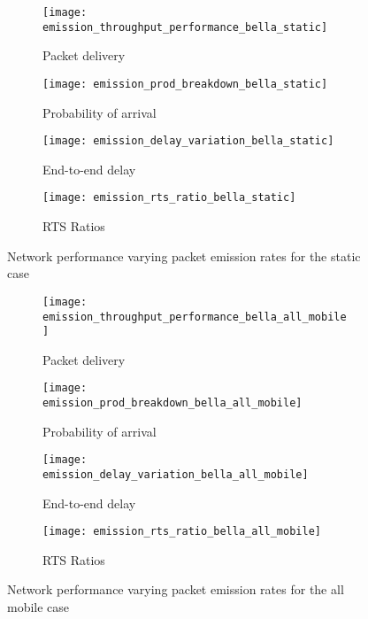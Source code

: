 \begin{figure}[tp!]
	\begin{subfigure}[t]{0.5\textwidth}
		\centering
		\texttt{[image: emission\_throughput\_performance\_bella\_static]}
		\caption{Packet delivery}
		\label{fig:emission_throughput_performance_bella_static}
	\end{subfigure}
	\begin{subfigure}[t]{0.5\textwidth}
		\centering
		\texttt{[image: emission\_prod\_breakdown\_bella\_static]}
		\caption{Probability of arrival}
		\label{fig:emission_prod_breakdown_bella_static}
	\end{subfigure}
	
	\begin{subfigure}[t]{0.5\textwidth}
		\centering
		\texttt{[image: emission\_delay\_variation\_bella\_static]}
		\caption{End-to-end delay}
		\label{fig:emission_delay_variation_bella_static}
	\end{subfigure}
	\begin{subfigure}[t]{0.5\textwidth}
		\centering
		\texttt{[image: emission\_rts\_ratio\_bella\_static]}
		\caption{RTS Ratios}
		\label{fig:emission_rts_ratio_bella_static}
	\end{subfigure}
	\caption{Network performance varying packet emission rates for the static case}
	\label{fig:emission_bella_static}
\end{figure}


\begin{figure}[bp!]
	\begin{subfigure}[t]{0.5\textwidth}
		\centering
		\texttt{[image: emission\_throughput\_performance\_bella\_all\_mobile]}
		\caption{Packet delivery}
		\label{fig:emission_throughput_performance_bella_all_mobile}
	\end{subfigure}
	\begin{subfigure}[t]{0.5\textwidth}
		\centering
		\texttt{[image: emission\_prod\_breakdown\_bella\_all\_mobile]}
		\caption{Probability of arrival}
		\label{fig:emission_prod_breakdown_bella_all_mobile}
	\end{subfigure}
	
	\begin{subfigure}[t]{0.5\textwidth}
		\centering
		\texttt{[image: emission\_delay\_variation\_bella\_all\_mobile]}
		\caption{End-to-end delay}
		\label{fig:emission_delay_variation_bella_all_mobile}
	\end{subfigure}
	\begin{subfigure}[t]{0.5\textwidth}
		\centering
		\texttt{[image: emission\_rts\_ratio\_bella\_all\_mobile]}
		\caption{RTS Ratios}
		\label{fig:emission_rts_ratio_bella_all_mobile}
	\end{subfigure}
	\caption{Network performance varying packet emission rates for the all mobile case}
	\label{fig:emission_bella_all_mobile}
\end{figure}


